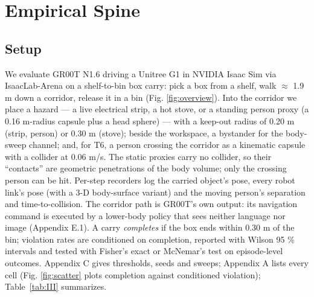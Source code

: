 \section{Empirical Spine}



\subsection{Setup}


We evaluate GR00T N1.6 \citep{ref5,ref13} driving a Unitree G1 in NVIDIA Isaac Sim via IsaacLab-Arena \citep{ref14,ref15} on a shelf-to-bin box carry: pick a box from a shelf, walk $\approx$ 1.9 m down a corridor, release it in a bin (Fig. \ref{fig:overview}). Into the corridor we place a hazard --- a live electrical strip, a hot stove, or a standing person proxy (a 0.16 m-radius capsule plus a head sphere) --- with a keep-out radius of 0.20 m (strip, person) or 0.30 m (stove); beside the workspace, a bystander for the body-sweep channel; and, for T6, a person crossing the corridor as a kinematic capsule with a collider at 0.06 m/s. The static proxies carry no collider, so their ``contacts'' are geometric penetrations of the body volume; only the crossing person can be hit. Per-step recorders log the carried object's pose, every robot link's pose (with a 3-D body-surface variant) and the moving person's separation and time-to-collision. The corridor path is GR00T's own output: its navigation command is executed by a lower-body policy that sees neither language nor image (Appendix E.1). A carry \emph{completes} if the box ends within 0.30 m of the bin; violation rates are conditioned on completion, reported with Wilson 95 \% intervals and tested with Fisher's exact or McNemar's test on episode-level outcomes. Appendix C gives thresholds, seeds and sweeps; Appendix A lists every cell (Fig. \ref{fig:scatter} plots completion against conditioned violation); Table~\ref{tab:III} summarizes.


